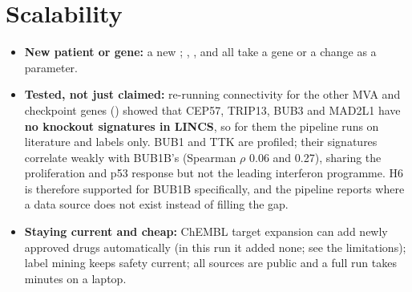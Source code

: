 \documentclass[10pt]{article}
\begin{document}
\section{Scalability}
\begin{itemize}
\item \textbf{New patient or gene:} a new ; , ,
   and  all take a gene or a change as a parameter.
\item \textbf{Tested, not just claimed:} re-running connectivity for the other MVA and checkpoint genes
  () showed that CEP57, TRIP13, BUB3 and MAD2L1 have \textbf{no knockout signatures in LINCS},
  so for them the pipeline runs on literature and labels only. BUB1 and TTK are profiled; their signatures correlate
  weakly with BUB1B's (Spearman $\rho$ 0.06 and 0.27), sharing the proliferation and p53 response but not the leading
  interferon programme. H6 is therefore supported for BUB1B specifically, and the pipeline reports where a data
  source does not exist instead of filling the gap.
\item \textbf{Staying current and cheap:} ChEMBL target expansion can add newly approved drugs automatically (in this
  run it added none; see the limitations); label mining
  keeps safety current; all sources are public and a full run takes minutes on a laptop.
\end{itemize}
\end{document}
